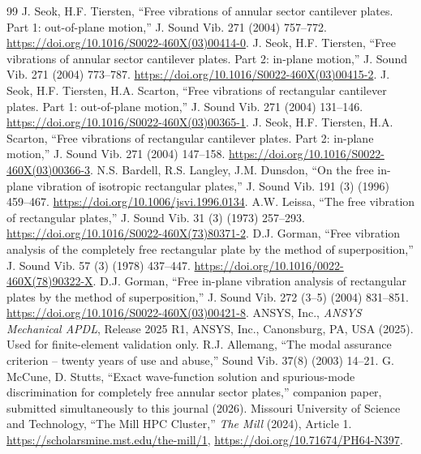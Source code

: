 \documentclass[11pt]{article}
\begin{document}
\begin{thebibliography}{99}\small
\setlength{\itemsep}{0pt}
\setlength{\parsep}{0pt}
 J. Seok, H.F. Tiersten, ``Free vibrations of annular sector
cantilever plates. Part 1: out-of-plane motion,'' J. Sound Vib. 271 (2004)
757--772. \url{https://doi.org/10.1016/S0022-460X(03)00414-0}.
 J. Seok, H.F. Tiersten, ``Free vibrations of annular sector
cantilever plates. Part 2: in-plane motion,'' J. Sound Vib. 271 (2004)
773--787. \url{https://doi.org/10.1016/S0022-460X(03)00415-2}.
 J. Seok, H.F. Tiersten, H.A. Scarton, ``Free vibrations of
rectangular cantilever plates. Part 1: out-of-plane motion,'' J. Sound
Vib. 271 (2004) 131--146. \url{https://doi.org/10.1016/S0022-460X(03)00365-1}.
 J. Seok, H.F. Tiersten, H.A. Scarton, ``Free vibrations of
rectangular cantilever plates. Part 2: in-plane motion,'' J. Sound Vib.
271 (2004) 147--158. \url{https://doi.org/10.1016/S0022-460X(03)00366-3}.
 N.S. Bardell, R.S. Langley, J.M. Dunsdon, ``On the
free in-plane vibration of isotropic rectangular plates,'' J. Sound Vib.
191 (3) (1996) 459--467. \url{https://doi.org/10.1006/jsvi.1996.0134}.
 A.W. Leissa, ``The free vibration of rectangular
plates,'' J. Sound Vib. 31 (3) (1973) 257--293.
\url{https://doi.org/10.1016/S0022-460X(73)80371-2}.
 D.J. Gorman, ``Free vibration analysis of the
completely free rectangular plate by the method of superposition,''
J. Sound Vib. 57 (3) (1978) 437--447.
\url{https://doi.org/10.1016/0022-460X(78)90322-X}.
 D.J. Gorman, ``Free in-plane vibration analysis of
rectangular plates by the method of superposition,'' J. Sound Vib. 272
(3--5) (2004) 831--851. \url{https://doi.org/10.1016/S0022-460X(03)00421-8}.
 ANSYS, Inc., \emph{ANSYS Mechanical APDL}, Release 2025 R1,
ANSYS, Inc., Canonsburg, PA, USA (2025). Used for finite-element validation
only.
 R.J. Allemang, ``The modal assurance criterion --
twenty years of use and abuse,'' Sound Vib. 37(8) (2003) 14--21.
 G. McCune, D. Stutts, ``Exact wave-function
solution and spurious-mode discrimination for completely free annular
sector plates,'' companion paper, submitted simultaneously to this
journal (2026).
 Missouri University of Science and Technology, ``The
Mill HPC Cluster,'' \emph{The Mill} (2024), Article 1.
\url{https://scholarsmine.mst.edu/the-mill/1},
\url{https://doi.org/10.71674/PH64-N397}.
\end{thebibliography}
\end{document}
